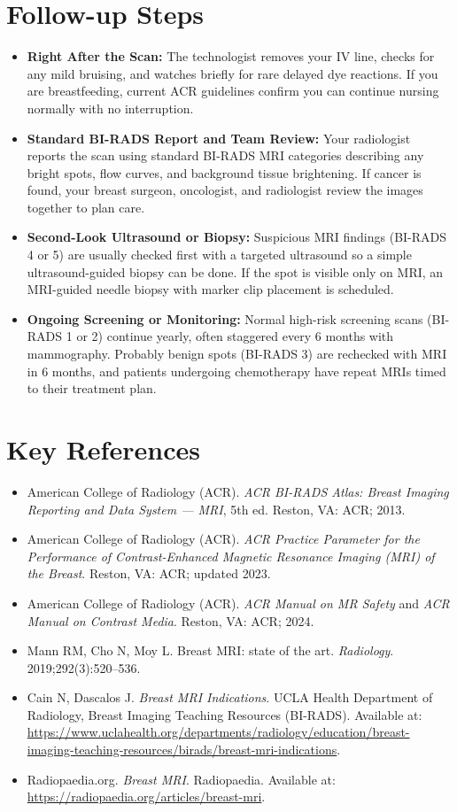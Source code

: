 \section{Follow-up Steps}
\begin{itemize}
\item \textbf{Right After the Scan:} The technologist removes your IV line, checks for any mild bruising, and watches briefly for rare delayed dye reactions. If you are breastfeeding, current ACR guidelines confirm you can continue nursing normally with no interruption.
\item \textbf{Standard BI-RADS Report and Team Review:} Your radiologist reports the scan using standard BI-RADS MRI categories describing any bright spots, flow curves, and background tissue brightening. If cancer is found, your breast surgeon, oncologist, and radiologist review the images together to plan care.
\item \textbf{Second-Look Ultrasound or Biopsy:} Suspicious MRI findings (BI-RADS 4 or 5) are usually checked first with a targeted ultrasound so a simple ultrasound-guided biopsy can be done. If the spot is visible only on MRI, an MRI-guided needle biopsy with marker clip placement is scheduled.
\item \textbf{Ongoing Screening or Monitoring:} Normal high-risk screening scans (BI-RADS 1 or 2) continue yearly, often staggered every 6 months with mammography. Probably benign spots (BI-RADS 3) are rechecked with MRI in 6 months, and patients undergoing chemotherapy have repeat MRIs timed to their treatment plan.
\end{itemize}

\section{Key References}
\begin{itemize}
\item American College of Radiology (ACR). \textit{ACR BI-RADS Atlas: Breast Imaging Reporting and Data System --- MRI}, 5th ed. Reston, VA: ACR; 2013.
\item American College of Radiology (ACR). \textit{ACR Practice Parameter for the Performance of Contrast-Enhanced Magnetic Resonance Imaging (MRI) of the Breast}. Reston, VA: ACR; updated 2023.
\item American College of Radiology (ACR). \textit{ACR Manual on MR Safety} and \textit{ACR Manual on Contrast Media}. Reston, VA: ACR; 2024.
\item Mann RM, Cho N, Moy L. Breast MRI: state of the art. \textit{Radiology}. 2019;292(3):520--536.
\item Cain N, Dascalos J. \textit{Breast MRI Indications}. UCLA Health Department of Radiology, Breast Imaging Teaching Resources (BI-RADS). Available at: \url{https://www.uclahealth.org/departments/radiology/education/breast-imaging-teaching-resources/birads/breast-mri-indications}.
\item Radiopaedia.org. \textit{Breast MRI}. Radiopaedia. Available at: \url{https://radiopaedia.org/articles/breast-mri}.
\end{itemize}

